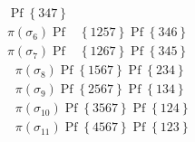 \documentclass[aps,preprint]{revtex4}%
\begin{document}
\begin{enumerate}
\begin{align}
\operatorname{Pf}\left\{  347\right\} \\
\pi\left(  \sigma_{6}\right)  \operatorname{Pf}  &  \left\{  1257\right\}
\operatorname{Pf}\left\{  346\right\} \\
\pi\left(  \sigma_{7}\right)  \operatorname{Pf}  &  \left\{  1267\right\}
\operatorname{Pf}\left\{  345\right\}
\end{align}%
\begin{align}
&  \pi\left(  \sigma_{8}\right)  \operatorname{Pf}\left\{  1567\right\}
\operatorname{Pf}\left\{  234\right\} \\
&  \pi\left(  \sigma_{9}\right)  \operatorname{Pf}\left\{  2567\right\}
\operatorname{Pf}\left\{  134\right\} \\
&  \pi\left(  \sigma_{10}\right)  \operatorname{Pf}\left\{  3567\right\}
\operatorname{Pf}\left\{  124\right\} \\
&  \pi\left(  \sigma_{11}\right)  \operatorname{Pf}\left\{  4567\right\}
\operatorname{Pf}\left\{  123\right\}
\end{align}

\end{enumerate}
\end{document}
